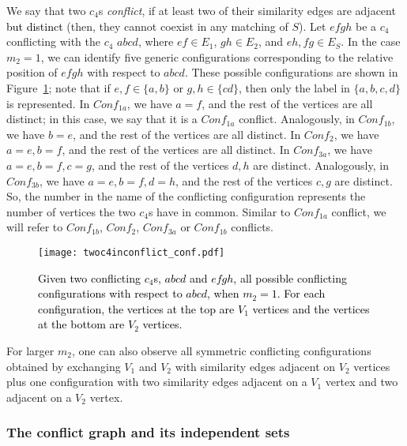\documentclass[final]{dmtcs-episciences}
\newcommand\mar[1]{\textcolor{black}{#1}}
\newcommand\ces[1]{\textcolor{black}{#1}}
\begin{document}
We say that
two $c_4$s  \emph{ conflict}, if at least two of their similarity edges are adjacent \mar{but distinct} (then, they cannot coexist in any matching of $S$).
Let $efgh$  be a $c_4$ conflicting with the $c_4$ $abcd$, where $ef\in E_1$, $gh\in E_2$, and $eh, fg\in E_S$. 
In the case $m_2=1$, we can identify five generic configurations corresponding to the relative position of $efgh$ with respect to $abcd$. These possible configurations are shown in Figure~\ref{twoc4}; note that if $e,f\in\{a,b\}$ or $g,h\in\{cd\}$, then only the label in $\{a,b,c,d\}$ is represented. In $Conf_{1a}$, we have $a=f$, and the rest of the vertices are all distinct; in this case, we say that it is a $Conf_{1a}$ conflict. Analogously, in 
$Conf_{1b}$, we have $b=e$, and the rest of the vertices are all distinct. In $Conf_{2}$, we have
$a=e, b=f$, and the rest of the vertices are all distinct. In $Conf_{3a}$, we have $a=e, b=f,c=g$, and 
the rest of the vertices $d,h$ are distinct. Analogously, in $Conf_{3b}$, we have $a=e, b=f, d=h$, and the rest of the vertices 
$c, g$ are distinct. So, the number in the name of the conflicting configuration represents the number of vertices the two $c_4$s have in common. Similar to $Conf_{1a}$ conflict, we will refer to $Conf_{1b}$, $Conf_{2}$, $Conf_{3a}$ or $Conf_{1b}$ conflicts. 

\begin{figure}[t]	   
\begin{center}	   
\texttt{[image: twoc4inconflict\_conf.pdf]} 
\caption{\sf \ces{Given two conflicting $c_4$s, $abcd$ and $efgh$, all possible conflicting configurations with respect to $abcd$, when $m_2=1$. 
For each configuration, the vertices at the top are $V_1$ vertices and the vertices at the bottom are $V_2$ vertices. }}
\label{twoc4}	   
\end{center}	   
\vspace*{-.4cm}	   
\end{figure} 





  

  


For larger $m_2$, one can also observe all symmetric conflicting configurations obtained by exchanging $V_1$ and $V_2$ with similarity edges adjacent on $V_2$ vertices plus one configuration with two similarity edges adjacent on a $V_1$ vertex and two adjacent on a $V_2$ vertex.

\subsubsection{The conflict graph and its independent sets}
\end{document}
